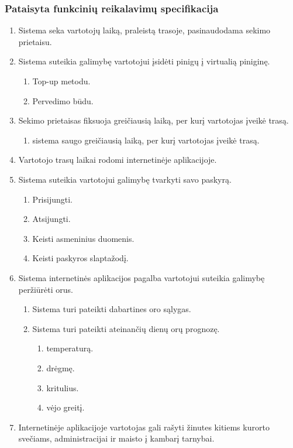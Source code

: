 \documentclass[oneside]{VUMIFPSkursinis}
\begin{document}
\subsubsection{Pataisyta funkcinių reikalavimų specifikacija}
\begin{enumerate}
	\item Sistema seka vartotojų laiką, praleistą trasoje, pasinaudodama sekimo prietaisu.
	\item Sistema suteikia galimybę vartotojui įsidėti pinigų į virtualią piniginę.
	\begin{enumerate}
		\item Top-up metodu.
		\item Pervedimo būdu.
	\end{enumerate}
	\item Sekimo prietaisas fiksuoja greičiausią laiką, per kurį vartotojas įveikė trasą.
	\begin{enumerate}
		\item sistema saugo greičiausią laiką, per kurį vartotojas įveikė trasą.
	\end{enumerate}
	\item Vartotojo trasų laikai rodomi internetinėje aplikacijoje.
	\item Sistema suteikia vartotojui galimybę tvarkyti savo paskyrą.
	\begin{enumerate}
		\item Prisijungti.
		\item Atsijungti.
		\item Keisti asmeninius duomenis.
		\item Keisti paskyros slaptažodį.
	\end{enumerate}
	\item Sistema internetinės aplikacijos pagalba vartotojui suteikia galimybę peržiūrėti orus.
	\begin{enumerate}
		\item Sistema turi pateikti dabartines oro sąlygas.
		\item Sistema turi pateikti ateinančių dienų orų prognozę.
		\begin{enumerate}
			\item temperaturą.
			\item drėgmę.
			\item kritulius.
			\item vėjo greitį.
		\end{enumerate}
	\end{enumerate}
	\item Internetinėje aplikacijoje vartotojas gali rašyti žinutes kitiems kurorto svečiams, administracijai ir maisto į kambarį tarnybai.

\end{enumerate}
\end{document}
